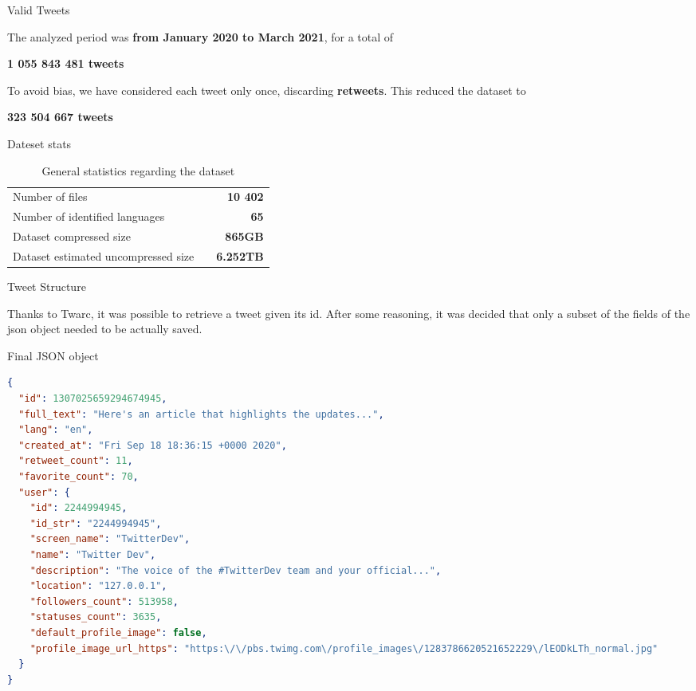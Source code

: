 \documentclass[8pt]{beamer}  %
\begin{document}
\begin{frame}{Valid Tweets}

	The analyzed period was \textbf{from January 2020 to March 2021}, for a total of 
	
	\begin{center}
	    \large\textbf{1 055 843 481 tweets}
	\end{center}
	
	To avoid bias, we have considered each tweet only once, discarding \textbf{retweets}. This reduced the dataset to
	
	\begin{center}
	    \large\textbf{323 504 667 tweets}
	\end{center}

\end{frame}

\begin{frame}{Dateset stats}

	\begin{table}[h]
        \centering
        \begin{tabularx}{\textwidth}{lXr}
            Number of files & & \textbf{10 402}
            \\ \lightrule
            Number of identified languages & & \textbf{65}
            \\ \lightrule
            Dataset compressed size & & \textbf{865GB}
            \\ \lightrule
            Dataset estimated uncompressed size & & \textbf{6.252TB}
        \end{tabularx}
        \caption{General statistics regarding the dataset}
        \label{tab:dataset_stast}
    \end{table}

\end{frame}

\begin{frame}[fragile]{Tweet Structure}

	Thanks to Twarc, it was possible to retrieve a tweet given its id. After some reasoning, it was decided that only a subset of the fields of the json object needed to be actually saved.
	
	\begin{block}{Final JSON object}
    	\begin{lstlisting}[language=json]
{
  "id": 1307025659294674945,
  "full_text": "Here's an article that highlights the updates...",
  "lang": "en",
  "created_at": "Fri Sep 18 18:36:15 +0000 2020",
  "retweet_count": 11,
  "favorite_count": 70,
  "user": {
    "id": 2244994945,
    "id_str": "2244994945",
    "screen_name": "TwitterDev",
    "name": "Twitter Dev",
    "description": "The voice of the #TwitterDev team and your official...",
    "location": "127.0.0.1",
    "followers_count": 513958,
    "statuses_count": 3635,
    "default_profile_image": false,
    "profile_image_url_https": "https:\/\/pbs.twimg.com\/profile_images\/1283786620521652229\/lEODkLTh_normal.jpg"
  }
}
        \end{lstlisting}
	\end{block}
	
\end{frame}
\end{document}
